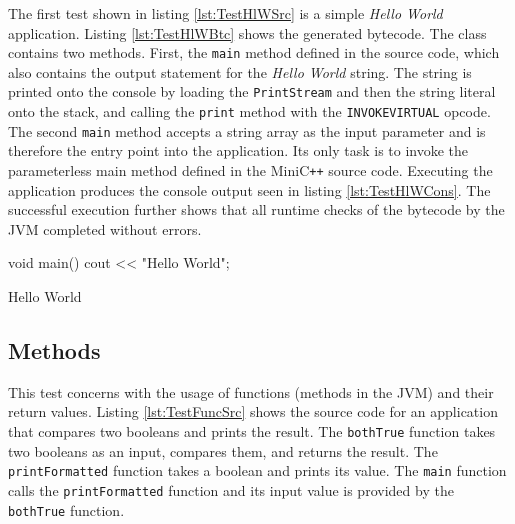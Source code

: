 The first test shown in listing \ref{lst:TestHlWSrc} is a simple \textit{Hello World} application. Listing \ref{lst:TestHlWBtc} shows the generated bytecode. The class contains two methods. First, the \verb|main| method defined in the source code, which also contains the output statement for the \textit{Hello World} string. The string is printed onto the console by loading the \verb|PrintStream| and then the string literal onto the stack, and calling the \verb|print| method with the \verb|INVOKEVIRTUAL| opcode. The second \verb|main| method accepts a string array as the input parameter and is therefore the entry point into the application. Its only task is to invoke the parameterless main method defined in the MiniC\verb|++| source code. Executing the application produces the console output seen in listing \ref{lst:TestHlWCons}. The successful execution further shows that all runtime checks of the bytecode by the JVM completed without errors.

\begin{CppCode}[float,numbers=none,caption=MiniC\texttt{++} source code of a \textit{Hello World} application., label=lst:TestHlWSrc]
void main() {
    cout << "Hello World";
}    
\end{CppCode}



\begin{GenericCode}[float,numbers=none,caption=Console output of a \textit{Hello World} application., label=lst:TestHlWCons]
Hello World
\end{GenericCode}


\subsection{Methods}

This test concerns with the usage of functions (methods in the JVM) and their return values. Listing \ref{lst:TestFuncSrc} shows the source code for an application that compares two booleans and prints the result. The \verb|bothTrue| function takes two booleans as an input, compares them, and returns the result. The \verb|printFormatted| function takes a boolean and prints its value. The \verb|main| function calls the \verb|printFormatted| function and its input value is provided by the \verb|bothTrue| function.

